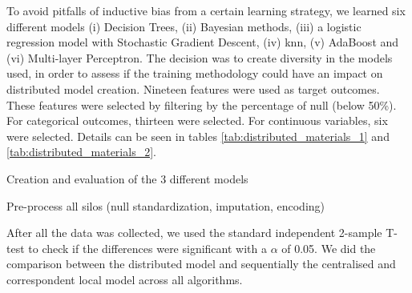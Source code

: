 To avoid pitfalls of inductive bias from a certain learning strategy, we learned six different models (i) Decision Trees, (ii) Bayesian methods, (iii) a logistic regression model with Stochastic Gradient Descent, (iv) \ac{knn}, (v) AdaBoost and (vi) Multi-layer Perceptron. The decision was to create diversity in the models used, in order to assess if the training methodology could have an impact on distributed model creation.
Nineteen features were used as target outcomes. These features were selected by filtering by the percentage of null (below 50\%). For categorical outcomes, thirteen were selected. For continuous variables, six were selected. Details can be seen in tables \ref{tab:distributed_materials_1} and \ref{tab:distributed_materials_2}.


\begin{algorithm}[hbtp]
\caption{Creation and evaluation of the 3 different models}
\label{alg:distributed_1}
Pre-process all silos (null standardization, imputation, encoding)\;


 \end{algorithm}

After all the data was collected, we used the standard independent 2-sample T-test to check if the differences were significant with a $\alpha$ of 0.05. We did the comparison between the distributed model and sequentially the centralised and correspondent local model across all algorithms.